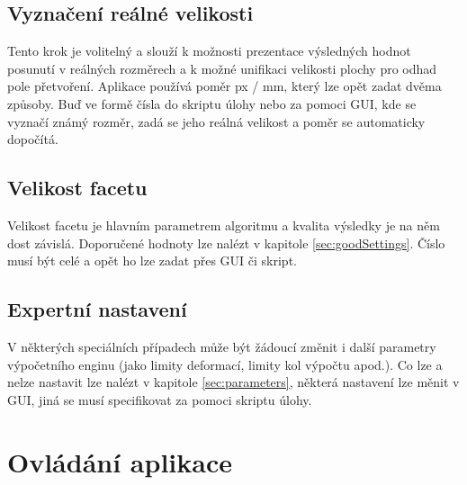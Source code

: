 \documentclass[a4paper,12pt]{article}
\begin{document}
\subsection{Vyznačení reálné velikosti}
Tento krok je volitelný a slouží k možnosti prezentace výsledných hodnot posunutí v reálných rozměrech a k možné unifikaci velikosti plochy pro odhad pole přetvoření. Aplikace používá poměr px / mm, který lze opět zadat dvěma způsoby. Buď ve formě čísla do skriptu úlohy nebo za pomoci GUI, kde se vyznačí známý rozměr, zadá se jeho reálná velikost a poměr se automaticky dopočítá.
\subsection{Velikost facetu}
Velikost facetu je hlavním parametrem algoritmu a kvalita výsledky je na něm dost závislá. Doporučené hodnoty lze nalézt v kapitole \ref{sec:goodSettings}. Číslo musí být celé a opět ho lze zadat přes GUI či skript.
\subsection{Expertní nastavení}
V některých speciálních případech může být žádoucí změnit i další parametry výpočetního enginu (jako limity deformací, limity kol výpočtu apod.). Co lze a nelze nastavit lze nalézt v kapitole \ref{sec:parameters}, některá nastavení lze měnit v GUI, jiná se musí specifikovat za pomoci skriptu úlohy.
\newpage
\section{Ovládání aplikace}
\label{sec:gui}
\end{document}
